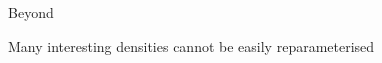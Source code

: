 \begin{frame}{Beyond}

	Many interesting densities cannot be easily reparameterised %
	
	~
	
\end{frame}
